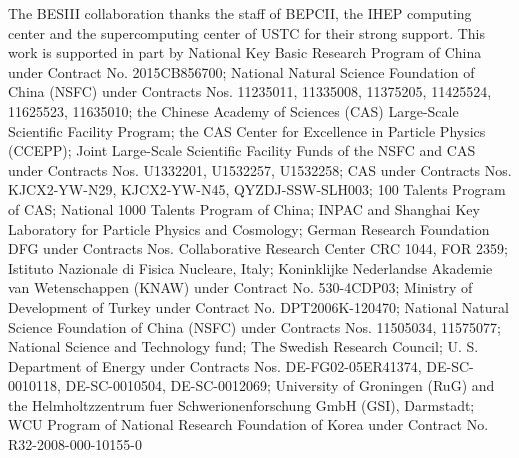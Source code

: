 \documentclass[twocolumn,showpacs,superscriptaddress,amsmath,amssymb]{revtex4-1}
\begin{document}
The BESIII collaboration thanks the staff of BEPCII, the IHEP computing center and the supercomputing center of USTC for their strong support. This work is supported in part by National Key Basic Research Program of China under Contract No. 2015CB856700; National Natural Science Foundation of China (NSFC) under Contracts Nos. 11235011, 11335008, 11375205, 11425524, 11625523, 11635010; the Chinese Academy of Sciences (CAS) Large-Scale Scientific Facility Program; the CAS Center for Excellence in Particle Physics (CCEPP); Joint Large-Scale Scientific Facility Funds of the NSFC and CAS under Contracts Nos. U1332201, U1532257, U1532258; CAS under Contracts Nos. KJCX2-YW-N29, KJCX2-YW-N45, QYZDJ-SSW-SLH003; 100 Talents Program of CAS; National 1000 Talents Program of China; INPAC and Shanghai Key Laboratory for Particle Physics and Cosmology; German Research Foundation DFG under Contracts Nos. Collaborative Research Center CRC 1044, FOR 2359; Istituto Nazionale di Fisica Nucleare, Italy; Koninklijke Nederlandse Akademie van Wetenschappen (KNAW) under Contract No. 530-4CDP03; Ministry of Development of Turkey under Contract No. DPT2006K-120470; National Natural Science Foundation of China (NSFC) under Contracts Nos. 11505034, 11575077; National Science and Technology fund; The Swedish Research Council; U. S. Department of Energy under Contracts Nos. DE-FG02-05ER41374, DE-SC-0010118, DE-SC-0010504, DE-SC-0012069; University of Groningen (RuG) and the Helmholtzzentrum fuer Schwerionenforschung GmbH (GSI), Darmstadt; WCU Program of National Research Foundation of Korea under Contract No. R32-2008-000-10155-0


\end{document}
